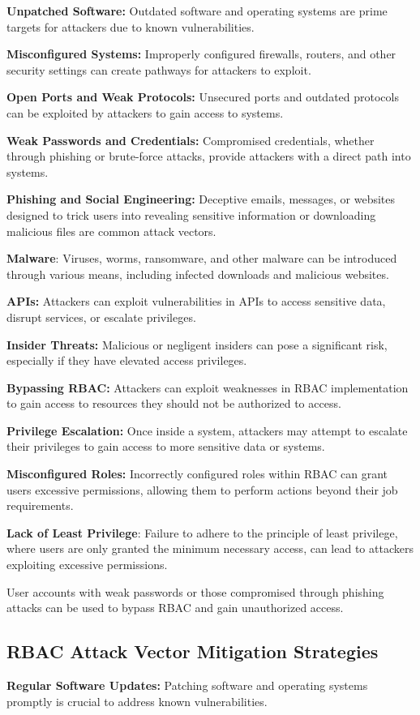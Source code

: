 \textbf{Unpatched Software:}
Outdated software and operating systems are prime targets for attackers due to known vulnerabilities. 

\textbf{Misconfigured Systems:}
Improperly configured firewalls, routers, and other security settings can create pathways for attackers to exploit. 

\textbf{Open Ports and Weak Protocols:}
Unsecured ports and outdated protocols can be exploited by attackers to gain access to systems. 

\textbf{Weak Passwords and Credentials:}
Compromised credentials, whether through phishing or brute-force attacks, provide attackers with a direct path into systems. 

\textbf{Phishing and Social Engineering:}
Deceptive emails, messages, or websites designed to trick users into revealing sensitive information or downloading malicious files are common attack vectors. 

\textbf{Malware}:
Viruses, worms, ransomware, and other malware can be introduced through various means, including infected downloads and malicious websites. 

\textbf{APIs:}
Attackers can exploit vulnerabilities in APIs to access sensitive data, disrupt services, or escalate privileges. 

\textbf{Insider Threats:}
Malicious or negligent insiders can pose a significant risk, especially if they have elevated access privileges. 

\textbf{Bypassing RBAC:}
Attackers can exploit weaknesses in RBAC implementation to gain access to resources they should not be authorized to access. 

\textbf{Privilege Escalation:}
Once inside a system, attackers may attempt to escalate their privileges to gain access to more sensitive data or systems.

\textbf{Misconfigured Roles:}
Incorrectly configured roles within RBAC can grant users excessive permissions, allowing them to perform actions beyond their job requirements. 

\textbf{Lack of Least Privilege}:
Failure to adhere to the principle of least privilege, where users are only granted the minimum necessary access, can lead to attackers exploiting excessive permissions. 

User accounts with weak passwords or those compromised through phishing attacks can be used to bypass RBAC and gain unauthorized access. 

\subsection{RBAC Attack Vector Mitigation Strategies}
\textbf{Regular Software Updates:}
Patching software and operating systems promptly is crucial to address known vulnerabilities. 
    
